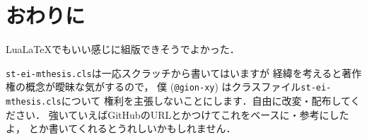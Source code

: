 \chapter{おわりに}
{Lua\LaTeX}でもいい感じに組版できそうでよかった．

\texttt{st-ei-mthesis.cls}は一応スクラッチから書いてはいますが
経緯を考えると著作権の概念が曖昧な気がするので，
僕 (\texttt{@gion-xy}) はクラスファイル\texttt{st-ei-mthesis.cls}について
権利を主張しないことにします．自由に改変・配布してください．
強いていえばGitHubのURLとかつけてこれをベースに・参考にしたよ，
とか書いてくれるとうれしいかもしれません．
